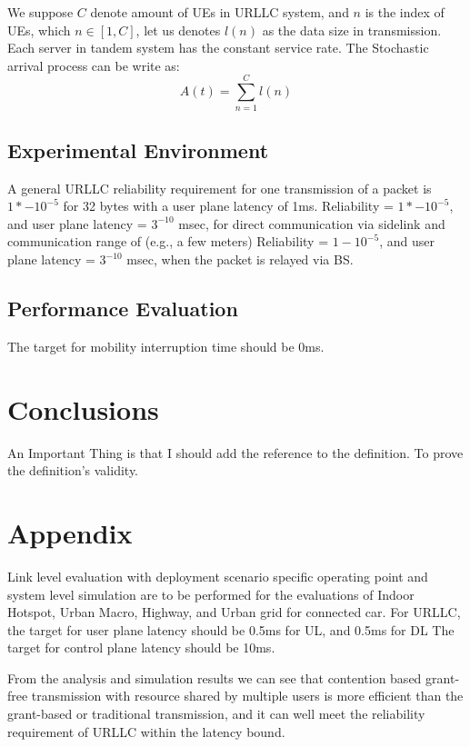 \documentclass[conference]{IEEEtran}
\begin{document}
We suppose $C$ denote amount of UEs in URLLC system, and $n$ is the index of UEs, which $n\in[1, C]$, let us denotes $l(n)$ as the data size in transmission. Each server in tandem system has the constant service rate. The Stochastic arrival process can be write as:
\begin{equation}
A(t)=\sum^{C}_{n=1}l(n)
\end{equation}


\subsection{Experimental Environment}
A general URLLC reliability requirement for one transmission of a packet is $1*-10^{-5}$ for 32 bytes with a user plane latency of 1ms.
Reliability = $1*-10^{-5}$, and user plane latency = $3^{-10}$ msec, for direct communication via sidelink and communication range of (e.g., a few meters)
Reliability = $1-10^{-5}$, and user plane latency = $3^{-10}$ msec, when the packet is relayed via BS.

\subsection{Performance Evaluation}
The target for mobility interruption time should be 0ms.
\section{Conclusions}

An Important Thing is that I should add the reference to the definition. To prove the definition's validity.

\section{Appendix}
Link level evaluation with deployment scenario specific operating point and system level simulation are to be performed for the evaluations of Indoor Hotspot, Urban Macro, Highway, and Urban grid for connected car.
For URLLC, the target for user plane latency should be 0.5ms for UL, and 0.5ms for DL
The target for control plane latency should be 10ms.

From the analysis and simulation results we can see that contention based grant-free transmission with resource shared by multiple users is more efficient than the grant-based or traditional transmission, and it can well meet the reliability requirement of URLLC within the latency bound.
\end{document}

